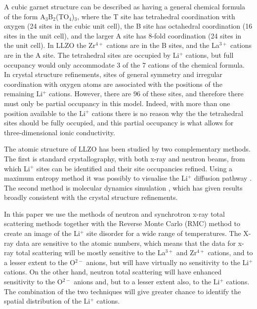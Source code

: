 \documentclass[twoside,twocolumn,9pt]{article}
\begin{document}
A cubic garnet structure can be described \cite{Cussen:2011dg} as having a general chemical formula of the form A$_3$B$_2$(TO$_4$)$_3$, where the T site has tetrahedral coordination with oxygen (24 sites in the cubic unit cell), the B site has octahedral coordination (16 sites in the unit cell), and the larger A site has 8-fold coordination (24 sites in the unit cell). In LLZO the Zr$^{4+}$ cations are in the B sites, and the La$^{3+}$ cations are in the A site. The tetrahedral sites are occupied by Li$^+$ cations, but full occupancy would only accommodate 3 of the 7 cations of the chemical formula. In crystal structure refinements, sites of general symmetry and irregular coordination with oxygen atoms are associated with the positions of the remaining Li$^+$ cations. However, there are 96 of these sites, and therefore there must only be partial occupancy in this model. Indeed, with more than one position available to the Li$^+$ cations there is no reason why the the tetrahedral sites should be fully occupied, and this partial occupancy is what allows for three-dimensional ionic conductivity.

The atomic structure of LLZO has been studied by two complementary methods. The first is standard crystallography, with both x-ray \cite{Awaka:2009jv,Buschmann:2011jo,Geiger:2011cg, Awaka:2011il, DanielRettenwander:2016ei,Wagner:2016bh,Kataoka:2019go} and neutron \cite{Awaka:2009jv,Buschmann:2011jo,Xie:2011gv,Han:2012is,Li:2012fz,DanielRettenwander:2016ei,Wang:2014ic} beams, from which Li$^+$ sites can be identified and their site occupancies refined. Using a maximum entropy method it was possibly to visualise the Li$^+$ diffusion pathway \cite{Han:2012is}.
The second method is molecular dynamics simulation \cite{Wang:2014ic,Klenk:2015ey}, which has given results broadly consistent with the crystal structure refinements.

In this paper we use the methods of neutron and synchrotron x-ray total scattering methods together with the Reverse Monte Carlo (RMC) method to create an image of the Li$^+$ site disorder for a wide range of temperatures. The X-ray data are sensitive to the atomic numbers, which means that the data for  x-ray total scattering will be mostly sensitive to the La$^{3+}$ and Zr$^{4+}$ cations, and to a lesser extent to the O$^{2-}$ anions, but will have virtually no sensitivity to the Li$^+$ cations. On the other hand, neutron total scattering will have enhanced sensitivity to the O$^{2-}$ anions and, but to a lesser extent also, to the Li$^+$ cations. The combination of the two techniques will give greater chance to identify the spatial distribution of the  Li$^+$ cations.
\end{document}
